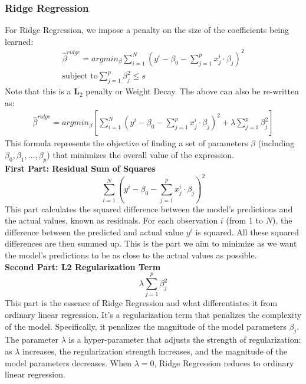 \documentclass{article}
\begin{document}
\subsubsection{Ridge Regression}
For Ridge Regression, we impose a penalty on the size of the coefficients being learned:
\begin{align*}
    \hat{\beta}^{ridge} = argmin_{\beta}\sum_{i=1}^{N}\left(y^{i}-\beta_{0}-\sum_{j=1}^{p}x_{j}^{i} \cdot \beta_{j}\right)^{2}\\
    \text{subject to} \sum_{j=1}^{p}\beta_{j}^{2} \leq s
\end{align*}
Note that this is a $\bm{L}_{2}$ penalty or Weight Decay. The above can also be re-written as:
\begin{align*}
    \hat{\beta}^{ridge} = argmin_{\beta}\left[ \sum_{i=1}^{N}\left(y^{i}-\beta_{0}-\sum_{j=1}^{p}x_{j}^{i} \cdot \beta_{j}\right)^{2} + \lambda \sum_{j=1}^{p}\beta_{j}^{2}\right]
\end{align*}
This formula represents the objective of finding a set of parameters \( \beta \) (including \( \beta_0, \beta_1, \ldots, \beta_p \)) that minimizes the overall value of the expression.\\

\textbf{First Part: Residual Sum of Squares}
\[
\sum_{i=1}^{N}\left(y^{i}-\beta_{0}-\sum_{j=1}^{p}x_{j}^{i} \cdot \beta_{j}\right)^{2}
\]
This part calculates the squared difference between the model's predictions and the actual values, known as residuals. For each observation \( i \) (from 1 to \( N \)), the difference between the predicted and actual value \( y^{i} \) is squared. All these squared differences are then summed up. This is the part we aim to minimize as we want the model's predictions to be as close to the actual values as possible.\\

\textbf{Second Part: L2 Regularization Term}
\[
\lambda \sum_{j=1}^{p}\beta_{j}^{2}
\]
This part is the essence of Ridge Regression and what differentiates it from ordinary linear regression. It's a regularization term that penalizes the complexity of the model. Specifically, it penalizes the magnitude of the model parameters \( \beta_j \). The parameter \( \lambda \) is a hyper-parameter that adjusts the strength of regularization: as \( \lambda \) increases, the regularization strength increases, and the magnitude of the model parameters decreases. When \( \lambda = 0 \), Ridge Regression reduces to ordinary linear regression.\\
\end{document}
